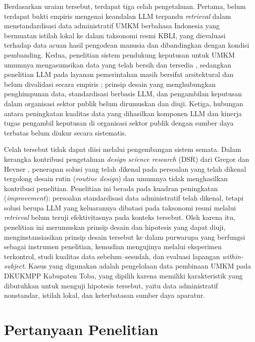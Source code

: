 \documentclass[12pt,a4paper]{report}
\begin{document}
Berdasarkan uraian tersebut, terdapat tiga celah pengetahuan. Pertama, belum terdapat bukti empiris mengenai keandalan LLM terpandu \textit{retrieval} dalam menstandardisasi data administratif UMKM berbahasa Indonesia yang bermuatan istilah lokal ke dalam taksonomi resmi KBLI, yang dievaluasi terhadap data acuan hasil pengodean manusia dan dibandingkan dengan kondisi pembanding. Kedua, penelitian sistem pendukung keputusan untuk UMKM umumnya mengasumsikan data yang telah bersih dan tersedia \cite{khotimah2024hybrid}, sedangkan penelitian LLM pada layanan pemerintahan masih bersifat arsitektural dan belum divalidasi secara empiris \cite{papageorgiou2024egov}; prinsip desain yang menghubungkan penghimpunan data, standardisasi berbasis LLM, dan pengambilan keputusan dalam organisasi sektor publik belum dirumuskan dan diuji. Ketiga, hubungan antara peningkatan kualitas data yang dihasilkan komponen LLM dan kinerja tugas pengambil keputusan di organisasi sektor publik dengan sumber daya terbatas belum diukur secara sistematis.

Celah tersebut tidak dapat diisi melalui pengembangan sistem semata. Dalam kerangka kontribusi pengetahuan \textit{design science research} (DSR) dari Gregor dan Hevner \cite{gregor2013positioning}, penerapan solusi yang telah dikenal pada persoalan yang telah dikenal tergolong desain rutin (\textit{routine design}) dan umumnya tidak menghasilkan kontribusi penelitian. Penelitian ini berada pada kuadran peningkatan (\textit{improvement}): persoalan standardisasi data administratif telah dikenal, tetapi solusi berupa LLM yang keluarannya dibatasi pada taksonomi resmi melalui \textit{retrieval} belum teruji efektivitasnya pada konteks tersebut. Oleh karena itu, penelitian ini merumuskan prinsip desain dan hipotesis yang dapat diuji, menginstansiasikan prinsip desain tersebut ke dalam purwarupa yang berfungsi sebagai instrumen penelitian, kemudian mengujinya melalui eksperimen terkontrol, studi kualitas data sebelum--sesudah, dan evaluasi lapangan \textit{within-subject}. Kasus yang digunakan adalah pengelolaan data pembinaan UMKM pada DKUKMPP Kabupaten Toba, yang dipilih karena memiliki karakteristik yang dibutuhkan untuk menguji hipotesis tersebut, yaitu data administratif nonstandar, istilah lokal, dan keterbatasan sumber daya aparatur.

\section{Pertanyaan Penelitian}
\label{sec:rq}
\end{document}
